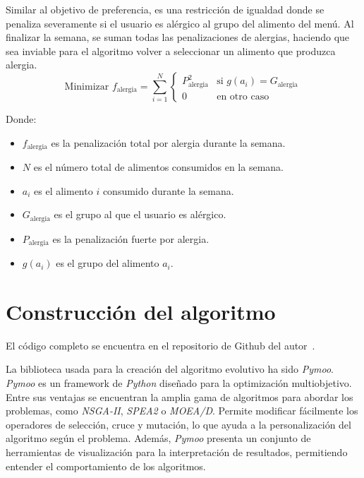 Similar al objetivo de preferencia, es una restricción de igualdad donde se penaliza severamente si el usuario es alérgico al grupo del alimento del menú. Al finalizar la semana, se suman todas las penalizaciones de alergias, haciendo que sea inviable para el algoritmo volver a seleccionar un alimento que produzca alergia.
\[
\text{Minimizar } f_{\text{alergia}} = \sum_{i=1}^{N} 
\begin{cases} 
P_{\text{alergia}}^2 & \text{si } g(a_i) = G_{\text{alergia}} \\
0 & \text{en otro caso}
\end{cases}
\]
\begin{small}
    Donde:
    \begin{itemize}
    \item \( f_{\text{alergia}} \) es la penalización total por alergia durante la semana.
    \item \( N \) es el número total de alimentos consumidos en la semana.
    \item \( a_i \) es el alimento \( i \) consumido durante la semana.
    \item \( G_{\text{alergia}} \) es el grupo al que el usuario es alérgico.
    \item \( P_{\text{alergia}} \) es la penalización fuerte por alergia.
    \item \( g(a_i) \) es el grupo del alimento \( a_i \).
    \end{itemize}
\end{small}

\section{Construcción del algoritmo}
\label{ch:explicacion-algoritmo}

El código completo se encuentra en el repositorio de Github del autor~\cite{quesada_nutritionplanning}.

La biblioteca usada para la creación del algoritmo evolutivo ha sido \textit{Pymoo}. \textit{Pymoo} es un framework de \textit{Python} diseñado para la optimización multiobjetivo. Entre sus ventajas se encuentran la amplia gama de algoritmos para abordar los problemas, como \textit{NSGA-II}, \textit{SPEA2} o \textit{MOEA/D}. Permite modificar fácilmente los operadores de selección, cruce y mutación, lo que ayuda a la personalización del algoritmo según el problema. Además, \textit{Pymoo} presenta un conjunto de herramientas de visualización para la interpretación de resultados, permitiendo entender el comportamiento de los algoritmos.~\cite{pymoo}

